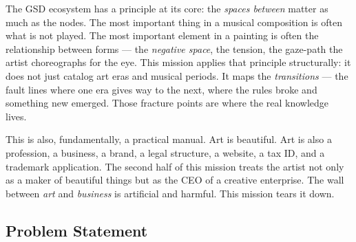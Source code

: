 \documentclass[11pt,letterpaper]{article}
\begin{document}
The GSD ecosystem has a principle at its core: the \emph{spaces between} matter as much as the nodes. The most important thing in a musical composition is often what is not played. The most important element in a painting is often the relationship between forms --- the \emph{negative space}, the tension, the gaze-path the artist choreographs for the eye. This mission applies that principle structurally: it does not just catalog art eras and musical periods. It maps the \emph{transitions} --- the fault lines where one era gives way to the next, where the rules broke and something new emerged. Those fracture points are where the real knowledge lives.

This is also, fundamentally, a practical manual. Art is beautiful. Art is also a profession, a business, a brand, a legal structure, a website, a tax ID, and a trademark application. The second half of this mission treats the artist not only as a maker of beautiful things but as the CEO of a creative enterprise. The wall between \emph{art} and \emph{business} is artificial and harmful. This mission tears it down.

\subsection{Problem Statement}
\end{document}

